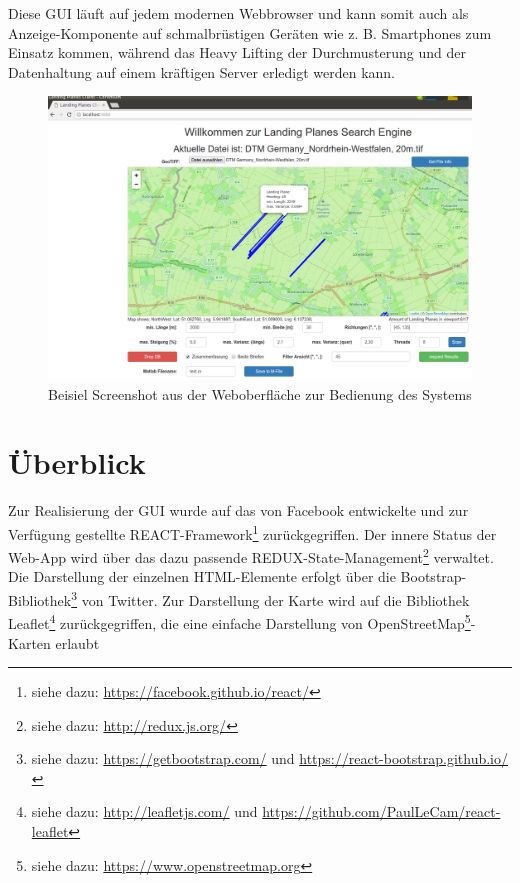 \documentclass[10pt,a4paper]{report}
\begin{document}
Diese GUI läuft auf jedem modernen Webbrowser und kann somit auch als Anzeige-Komponente auf schmalbrüstigen Geräten wie z. B. Smartphones zum Einsatz kommen, während das Heavy Lifting der Durchmusterung und der Datenhaltung auf einem kräftigen Server erledigt werden kann.

\begin{figure}[ht]
	\includegraphics[width=\textwidth]{./drawings/LandingClient_Screen1.png}
	\caption{Beisiel Screenshot aus der Weboberfläche zur Bedienung des Systems}
\end{figure}

\section{Überblick}

Zur Realisierung der GUI wurde auf das von Facebook entwickelte und zur Verfügung gestellte REACT-Framework\footnote{siehe dazu: \href{https://facebook.github.io/react/}{https://facebook.github.io/react/}} zurückgegriffen. Der innere Status der Web-App wird über das dazu passende REDUX-State-Management\footnote{siehe dazu: \href{http://redux.js.org/}{http://redux.js.org/}} verwaltet. Die Darstellung der einzelnen HTML-Elemente erfolgt über die Bootstrap-Bibliothek\footnote{siehe dazu: \href{https://getbootstrap.com/}{https://getbootstrap.com/} und \href{https://react-bootstrap.github.io/}{https://react-bootstrap.github.io/}} von Twitter. Zur Darstellung der Karte wird auf die Bibliothek Leaflet\footnote{siehe dazu: \href{http://leafletjs.com/}{http://leafletjs.com/} und \href{https://github.com/PaulLeCam/react-leaflet}{https://github.com/PaulLeCam/react-leaflet}} zurückgegriffen, die eine einfache Darstellung von OpenStreetMap\footnote{siehe dazu: \href{https://www.openstreetmap.org}{https://www.openstreetmap.org}}-Karten erlaubt
\end{document}
